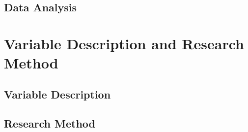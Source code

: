 \documentclass{mcmthesis}
\newlength\savewidth
\newcommand\shline{\noalign{\global\savewidth\arrayrulewidth
                            \global\arrayrulewidth 1.5pt}%
                   \hline
                   \noalign{\global\arrayrulewidth\savewidth}}
\begin{document}
\subsection{Data Analysis}

\section{Variable Description and Research Method}
\subsection{Variable Description}
\subsection{Research Method}
\end{document}
